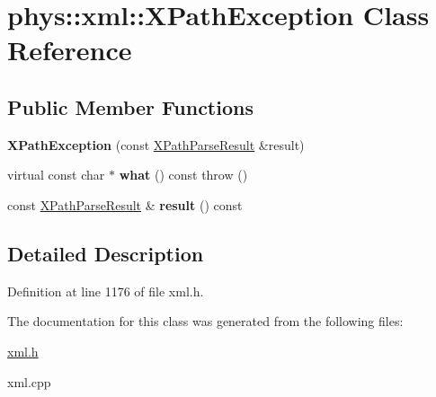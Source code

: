 \hypertarget{classphys_1_1xml_1_1XPathException}{
\section{phys::xml::XPathException Class Reference}
\label{d4/d30/classphys_1_1xml_1_1XPathException}
}
\subsection*{Public Member Functions}
\begin{DoxyCompactItemize}
\item 
\hypertarget{classphys_1_1xml_1_1XPathException_a2c326bac98d78d0816310bfac6c3b68f}{
{\bfseries XPathException} (const \hyperlink{structphys_1_1xml_1_1XPathParseResult}{XPathParseResult} \&result)}
\label{d4/d30/classphys_1_1xml_1_1XPathException_a2c326bac98d78d0816310bfac6c3b68f}

\item 
\hypertarget{classphys_1_1xml_1_1XPathException_a36e9d9daa5c8e2680057b2e1642ed225}{
virtual const char $\ast$ {\bfseries what} () const   throw ()}
\label{d4/d30/classphys_1_1xml_1_1XPathException_a36e9d9daa5c8e2680057b2e1642ed225}

\item 
\hypertarget{classphys_1_1xml_1_1XPathException_a37af29b6a83c06c8f2bf89eace7704fd}{
const \hyperlink{structphys_1_1xml_1_1XPathParseResult}{XPathParseResult} \& {\bfseries result} () const }
\label{d4/d30/classphys_1_1xml_1_1XPathException_a37af29b6a83c06c8f2bf89eace7704fd}

\end{DoxyCompactItemize}


\subsection{Detailed Description}


Definition at line 1176 of file xml.h.



The documentation for this class was generated from the following files:\begin{DoxyCompactItemize}
\item 
\hyperlink{xml_8h}{xml.h}\item 
xml.cpp\end{DoxyCompactItemize}
